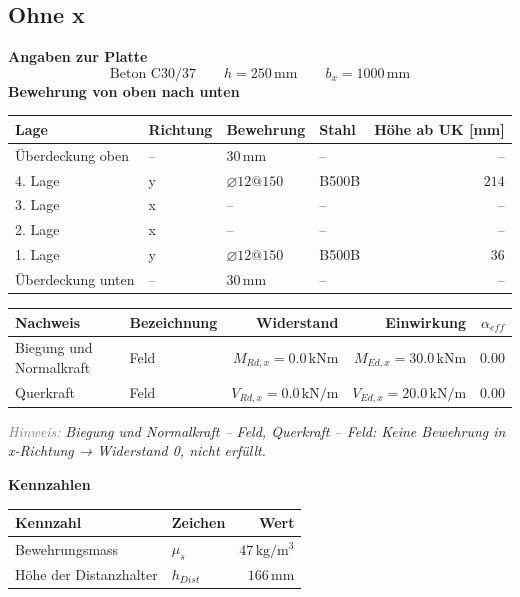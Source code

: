 \documentclass[11pt,a4paper]{article}
\newcommand{\hinweis}[2]{\par\noindent\textcolor{gray}{\textit{#1:}} \textit{#2}\par}
\begin{document}
\subsection{Ohne x}
\noindent\textbf{Angaben zur Platte}
\begin{equation*}
\text{Beton C30/37} \qquad h = 250\,\mathrm{mm} \qquad b_x = 1000\,\mathrm{mm}
\end{equation*}
\noindent\textbf{Bewehrung von oben nach unten}
\begin{longtable}{llllr}
\hline
Lage & Richtung & Bewehrung & Stahl & Höhe ab UK [mm] \\
\hline
\endhead
Überdeckung oben & – & $30\,\mathrm{mm}$ & – & – \\
4. Lage & y & $\varnothing 12@150$ & B500B & $214$ \\
3. Lage & x & – & – & – \\
2. Lage & x & – & – & – \\
1. Lage & y & $\varnothing 12@150$ & B500B & $36$ \\
Überdeckung unten & – & $30\,\mathrm{mm}$ & – & – \\
\hline
\end{longtable}
\begin{xltabular}{\linewidth}{>{\raggedright\arraybackslash}X>{\raggedright\arraybackslash}Xrrr}
\hline
Nachweis & Bezeichnung & Widerstand & Einwirkung & $\alpha_{eff}$ \\
\hline
\endhead
Biegung und Normalkraft & Feld & $M_{Rd,x} = 0.0\,\mathrm{kNm}$ & $M_{Ed,x} = 30.0\,\mathrm{kNm}$ & $0.00$ \\
Querkraft & Feld & $V_{Rd,x} = 0.0\,\mathrm{kN}/\mathrm{m}$ & $V_{Ed,x} = 20.0\,\mathrm{kN}/\mathrm{m}$ & $0.00$ \\
\hline
\end{xltabular}
\hinweis{Hinweis}{Biegung und Normalkraft – Feld, Querkraft – Feld: Keine Bewehrung in x-Richtung → Widerstand 0, nicht erfüllt.}
\noindent\textbf{Kennzahlen}
\begin{longtable}{llr}
\hline
Kennzahl & Zeichen & Wert \\
\hline
\endhead
Bewehrungsmass & $\mu_s$ & $47\,\mathrm{kg}/\mathrm{m}^{3}$ \\
Höhe der Distanzhalter & $h_{Dist}$ & $166\,\mathrm{mm}$ \\
\hline
\end{longtable}
\end{document}
